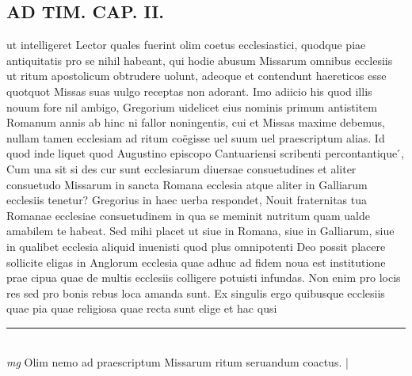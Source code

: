 \documentclass{article}
\begin{document}
\begin{pages}
\section*{AD TIM. CAP. II. }
\marginpar{[ p.111 ]}\pstart ut intelligeret Lector quales fuerint olim coetus ecclesiastici, quodque piae antiquitatis pro se nihil habeant, qui hodie abusum Missarum omnibus ecclesiis ut ritum apostolicum obtrudere uolunt, adeoque et contendunt haereticos esse quotquot Missas suas uulgo receptas non adorant. Imo adiicio his quod illis nouum fore nil ambigo, Gregorium uidelicet eius nominis primum antistitem Romanum annis ab hinc ni fallor noningentis, cui et Missas maxime debemus, nullam tamen ecclesiam ad ritum coëgisse uel suum uel praescriptum alias. Id quod inde liquet quod Augustino episcopo Cantuariensi scribenti percontantique ́, Cum una sit si des cur sunt ecclesiarum diuersae consuetudines et aliter consuetudo Missarum in sancta Romana ecclesia atque aliter in Galliarum ecclesiis tenetur? Gregorius in haec uerba respondet, Nouit fraternitas tua Romanae ecclesiae consuetudinem in qua se meminit nutritum quam ualde amabilem te habeat. Sed mihi placet ut siue in Romana, siue in Galliarum, siue in qualibet ecclesia aliquid inuenisti quod plus omnipotenti Deo possit placere sollicite eligas in Anglorum ecclesia quae adhuc ad fidem noua est institutione prae cipua quae de multis ecclesiis colligere potuisti infundas. Non enim pro locis res sed pro bonis rebus loca amanda sunt. Ex singulis ergo quibusque ecclesiis quae pia quae religiosa quae recta sunt elige et hac qusi  \pend
\vspace{0.5cm}\noindent
\vspace{0.2cm}\rule{1cm}{0.2pt}\\ 
\hspace{0.2cm}\textit{mg}
\footnotesize Olim nemo ad praescriptum Missarum ritum seruandum coactus. 
\normalsize| 

\end{pages}
\end{document}
